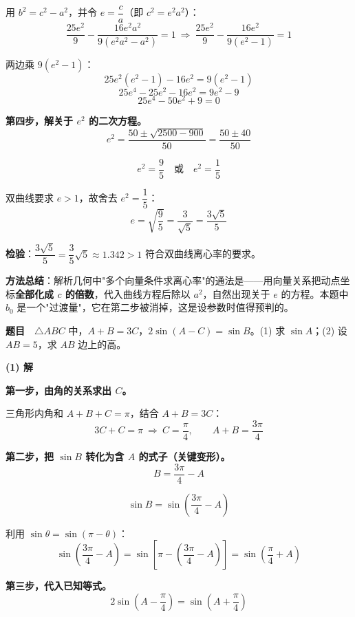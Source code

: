 用 $b^{2}=c^{2}-a^{2}$，并令 $e=\dfrac ca$（即 $c^{2}=e^{2}a^{2}$）：
\[\frac{25e^{2}}9-\frac{16e^{2}a^{2}}{9\left(e^{2}a^{2}-a^{2}\right)}=1\ \Longrightarrow\ \frac{25e^{2}}9-\frac{16e^{2}}{9\left(e^{2}-1\right)}=1\]

两边乘 $9\left(e^{2}-1\right)$：
\[25e^{2}\left(e^{2}-1\right)-16e^{2}=9\left(e^{2}-1\right)\]
\[25e^{4}-25e^{2}-16e^{2}=9e^{2}-9\]
\[25e^{4}-50e^{2}+9=0\]

\textbf{第四步，解关于 $e^{2}$ 的二次方程。}
\[e^{2}=\frac{50\pm\sqrt{2500-900}}{50}=\frac{50\pm40}{50}\]

\[e^{2}=\frac95\quad\text{或}\quad e^{2}=\frac15\]

双曲线要求 $e>1$，故舍去 $e^{2}=\dfrac15$：
\[e=\sqrt{\frac95}=\frac3{\sqrt5}=\frac{3\sqrt5}5\]


\begin{gktip}
\textbf{检验}：$\dfrac{3\sqrt5}5=\dfrac35\sqrt5\approx1.342>1$  符合双曲线离心率的要求。

\textbf{方法总结}：解析几何中"多个向量条件求离心率"的通法是——用向量关系把动点坐标\textbf{全部化成 $c$ 的倍数}，代入曲线方程后除以 $a^2$，自然出现关于 $e$ 的方程。本题中 $b_0$ 是一个"过渡量"，它在第二步被消掉，这是设参数时值得预判的。
\end{gktip}

\par\medskip



\textbf{题目}　$\triangle ABC$ 中，$A+B=3C$，$2\sin(A-C)=\sin B$。(1) 求 $\sin A$；(2) 设 $AB=5$，求 $AB$ 边上的高。

\par\medskip

\textbf{(1) 解}

\textbf{第一步，由角的关系求出 $C$。}

三角形内角和 $A+B+C=\pi$，结合 $A+B=3C$：
\[3C+C=\pi\ \Longrightarrow\ C=\frac\pi4,\qquad A+B=\frac{3\pi}4\]

\textbf{第二步，把 $\sin B$ 转化为含 $A$ 的式子（关键变形）。}
\[B=\frac{3\pi}4-A\]

\[\sin B=\sin\left(\frac{3\pi}4-A\right)\]

利用 $\sin\theta=\sin(\pi-\theta)$：
\[\sin\left(\frac{3\pi}4-A\right)=\sin\left[\pi-\left(\frac{3\pi}4-A\right)\right]=\sin\left(\frac\pi4+A\right)\]

\textbf{第三步，代入已知等式。}
\[2\sin\left(A-\frac\pi4\right)=\sin\left(A+\frac\pi4\right)\]

